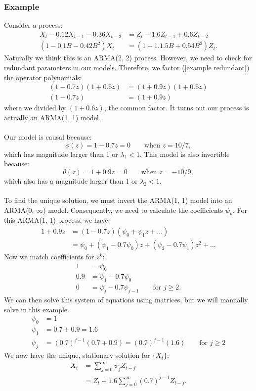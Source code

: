 \documentclass{article}
\begin{document}
\subsubsection{Example}
Consider a process:
\begin{align}\label{example redundant}
    X_t - 0.12X_{t-1}-0.36X_{t-2} &= Z_t - 1.6Z_{t-1}+0.6Z_{t-2}\nonumber\\
    (1-0.1B-0.42B^2)X_t &= (1+1.1.5B+0.54B^2)Z_t.
\end{align}
Naturally we think this is an ARMA(2, 2) process. However, we need to check for redundant parameters in our models. Therefore, we factor (\ref{example redundant}) the operator polynomials:
\begin{align}\label{reduced example}
    (1-0.7z)(1+0.6z) &= (1+0.9z)(1+0.6z)\nonumber\\
    (1-0.7z) &= (1+0.9z)
\end{align}
where we divided by $(1+0.6z)$, the common factor. It turns out our process is actually an ARMA(1, 1) model. \\\\
Our model is causal because:
\begin{equation}
    \phi(z) = 1-0.7z = 0 \qquad \text{when } z=10/7,
\end{equation}
which has magnitude larger than 1 or $\lambda_1 < 1$. This model is also invertible because:
\begin{equation}
    \theta(z) = 1+0.9z=0 \qquad \text{when } z=-10/9,
\end{equation}
which also has a magnitude larger than 1 or $\lambda_2 < 1$.\\\\
To find the unique solution, we must invert the ARMA(1, 1) model into an ARMA(0, $\infty$) model. Consequently, we need to calculate the coefficients $\psi_k$. For this ARMA(1, 1) process, we have:
\begin{align}\label{arma 1,1}
    1 + 0.9 z &= (1-0.7 z)(\psi_0+\psi_1 z +\ldots)\nonumber\\
    &= \psi_0 + (\psi_1-0.7\psi_0)z + (\psi_2-0.7\psi_1)z^2+\ldots\nonumber
\end{align}
Now we match coefficients for $z^k$:
\begin{align}
    1 &= \psi_0\nonumber\\
    0.9 &= \psi_1-0.7\psi_0\nonumber\\
    0&=\psi_j-0.7\psi_{j-1} \qquad \text{for } j\geq 2.\nonumber
\end{align}
We can then solve this system of equations using matrices, but we will manually solve in this example.
\begin{align}
    \psi_0 &= 1\nonumber\\
    \psi_1 &= 0.7 + 0.9=1.6\nonumber\\
    \psi_j &= (0.7)^{j-1}(0.7 + 0.9)=(0.7)^{j-1}(1.6) \qquad \text{for } j \geq2\nonumber
\end{align}
We now have the unique, stationary solution for $\{X_t\}$:
\begin{align}
    X_t &= \sum_{j=0}^{\infty} \psi_j Z_{t-j} \nonumber\\
    &=Z_t + 1.6\sum_{j=0}^{\infty}(0.7)^{j-1}Z_{t-j}.\nonumber
\end{align}
\end{document}
